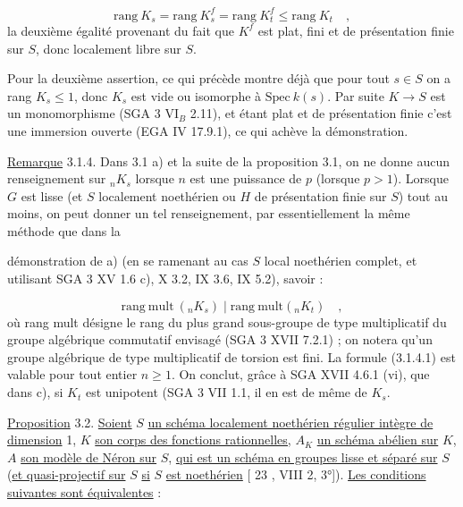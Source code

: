 \begin{equation*}
\mathrm{rang}\ K_{s} = \mathrm{rang}\ K^{f}_{s} = \mathrm{rang}\ K^{f}_{t} \leq \mathrm{rang}\ K_{t} \quad ,
\end{equation*}
la deuxième égalité provenant du fait que $K^{f}$ est plat, fini et de présentation finie sur $S$, donc localement libre sur $S$.

Pour la deuxième assertion, ce qui précède montre déjà que pour tout $s \in S$ on a rang $K_{s} \leq 1$, donc $K_{s}$ est vide ou isomorphe à $\mathrm{Spec}\ k(s)$. Par suite $K \longrightarrow S$ est un monomorphisme (SGA 3 VI$_{B}$ 2.11), et étant plat et de présentation finie c'est une immersion ouverte (EGA IV 17.9.1), ce qui achève la démonstration.

\underline{Remarque} 3.1.4. Dans 3.1 a) et la suite de la proposition 3.1, on ne donne aucun renseignement sur ${}_{n}K_{s}$ lorsque $n$ est une puissance de $p$ (lorsque $p > 1$). Lorsque $G$ est lisse (et $S$ localement noethérien ou $H$ de présentation finie sur $S$) tout au moins, on peut donner un tel renseignement, par essentiellement la même méthode que dans la



démonstration de a) (en se ramenant au cas $S$ local noethérien complet, et utilisant SGA 3 XV 1.6 c), X 3.2, IX 3.6, IX 5.2), savoir :

\begin{equation}\tag{3.1.4.1}
\mathrm{rang\ mult}\ ({}_n K_s) \mid \mathrm{rang\ mult}({}_n K_t) \quad ,
\end{equation}
où rang mult désigne le rang du plus grand sous-groupe de type multiplicatif du groupe algébrique commutatif envisagé (SGA 3 XVII 7.2.1) ; on notera qu'un groupe algébrique de type multiplicatif de torsion est fini. La formule (3.1.4.1) est valable pour tout entier $n \geq 1$. On conclut, grâce à SGA XVII 4.6.1 (vi), que dans c), si $K_t$ est unipotent (SGA 3 VII 1.1, il en est de même de $K_s$.

\underline{Proposition} 3.2. \underline{Soient} $S$ \underline{un schéma localement noethérien régulier intègre de dimension} 1, $K$ \underline{son corps des fonctions rationnelles,} $A_K$ \underline{un schéma abélien sur} $K$, $A$ \underline{son modèle de Néron sur} $S$, \underline{qui est un schéma en groupes lisse et séparé sur} $S$ (\underline{et quasi-projectif sur} $S$ \underline{si} $S$ \underline{est noethérien} [ 23 , VIII 2, 3°]). \underline{Les conditions suivantes sont équivalentes} :

